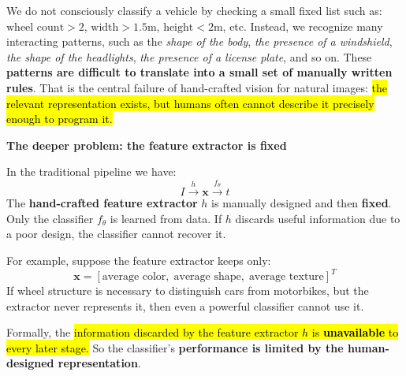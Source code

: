 \highspace
We do not consciously classify a vehicle by checking a small fixed list such as: $\text{wheel count} > 2$, $\text{width} > 1.5 \text{m}$, $\text{height} < 2 \text{m}$, etc. Instead, we recognize many interacting patterns, such as the \emph{shape of the body}, \emph{the presence of a windshield}, \emph{the shape of the headlights}, \emph{the presence of a license plate}, and so on. These \textbf{patterns are difficult to translate into a small set of manually written rules}. That is the central failure of hand-crafted vision for natural images: \hl{the relevant representation exists, but humans often cannot describe it precisely enough to program it.}

\highspace
\begin{flushleft}
    \textcolor{Red2}{ \textbf{The deeper problem: the feature extractor is fixed}}
\end{flushleft}
In the traditional pipeline we have:
\begin{equation*}
    I \xrightarrow{h} \mathbf{x} \xrightarrow{f_{\theta}} t
\end{equation*}
The \textbf{hand-crafted feature extractor} $h$ is manually designed and then \textbf{fixed}. Only the classifier $f_{\theta}$ is learned from data. If $h$ discards useful information due to a poor design, the classifier cannot recover it.

\highspace
For example, suppose the feature extractor keeps only:
\begin{equation*}
    \mathbf{x} = \left[
        \text{average color},\; \text{average shape},\; \text{average texture}
    \right]^{T}
\end{equation*}
If wheel structure is necessary to distinguish cars from motorbikes, but the extractor never represents it, then even a powerful classifier cannot use it.

\highspace
Formally, the \hl{information discarded by the feature extractor $h$ is \textbf{unavailable} to every later stage.} So the classifier's \textbf{performance is limited by the human-designed representation}.

\newpage

